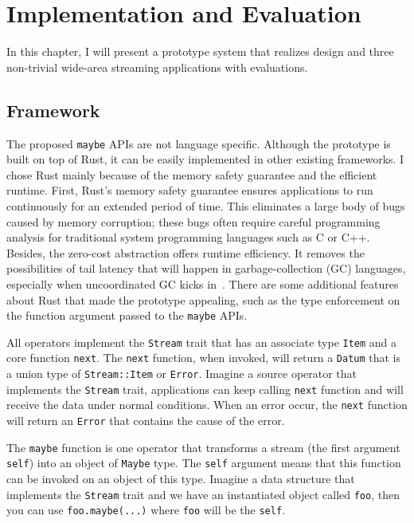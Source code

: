 \chapter{Implementation and Evaluation}
\label{sec:implementation}

In this chapter, I will present a prototype system that realizes \sysname{}
design and three non-trivial wide-area streaming applications with evaluations.

\section{Framework}
\label{sec:framework}

The proposed \texttt{maybe} APIs are not language specific. Although the
prototype is built on top of Rust, it can be easily implemented in other
existing frameworks. I chose Rust mainly because of the memory safety guarantee
and the efficient runtime. First, Rust's memory safety guarantee ensures
applications to run continuously for an extended period of time. This eliminates
a large body of bugs caused by memory corruption; these bugs often require
careful programming analysis for traditional system programming languages such
as C or C++. Besides, the zero-cost abstraction offers runtime efficiency. It
removes the possibilities of tail latency that will happen in garbage-collection
(GC) languages, especially when uncoordinated GC kicks
in~\cite{maas2016taurus}. There are some additional features about Rust that
made the prototype appealing, such as the type enforcement on the function
argument passed to the \texttt{maybe} APIs.

All operators implement the \texttt{Stream} trait that has an associate type
\texttt{Item} and a core function \texttt{next}. The \texttt{next} function,
when invoked, will return a \texttt{Datum} that is a union type of
\texttt{Stream::Item} or \texttt{Error}. Imagine a source operator that
implements the \texttt{Stream} trait, applications can keep calling
\texttt{next} function and will receive the data under normal conditions. When
an error occur, the \texttt{next} function will return an \texttt{Error} that
contains the cause of the error.

The \texttt{maybe} function is one operator that transforms a stream (the first
argument \texttt{self}) into an object of \texttt{Maybe} type. The \texttt{self}
argument means that this function can be invoked on an object of this
type. Imagine a data structure that implements the \texttt{Stream} trait and we
have an instantiated object called \texttt{foo}, then you can use
\texttt{foo.maybe(...)} where \texttt{foo} will be the \texttt{self}.

